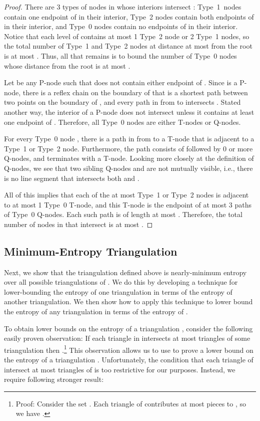 \documentclass[lotsofwhite]{patmorin}
\begin{document}
\begin{proof}
There are 3 types of nodes in  whose interiors intersect :
Type~1~nodes contain one endpoint of  in their interior, Type~2
nodes contain both endpoints of  in their interior, and Type~0
nodes contain no endpoints of  in their interior.  Notice that each
level of  contains at most 1 Type~2 node or 2 Type~1 nodes, so the
total number of Type~1 and Type~2 nodes at distance at most  from
the root is at most .  Thus, all
that remains is to bound the number of Type~0 nodes whose distance
from the root is at most .

Let  be any P-node such that  does not contain either
endpoint of .  Since  is a P-node, there is a reflex chain 
on the boundary of  that is a shortest path between two points on
the boundary of , and every path in  from  to 
intersects . Stated another way, the interior of a P-node does
not intersect  unless it contains at least one endpoint of .
Therefore, all Type~0 nodes are either T-nodes or Q-nodes.

For every Type~0 node , there is a path  in  from  to a
T-node that is adjacent to a Type~1 or Type~2 node.  Furthermore, the
path  consists of  followed by 0 or more Q-nodes, and
terminates with a T-node.  Looking more closely at the definition of
Q-nodes, we see that two sibling Q-nodes  and  are not mutually
visible, i.e., there is no line segment  that intersects
both  and .

All of this implies that each of the at most  Type~1 or Type~2 
nodes is adjacent to at most 1 Type~0 T-node, and this T-node is the
endpoint of at most 3 paths of Type~0 Q-nodes. Each such path is of
length at most .  Therefore, the total number of nodes in  that
intersect  is at most  .
\end{proof}

\subsection{Minimum-Entropy Triangulation}

Next, we show that the triangulation  defined above is
nearly-minimum entropy over all possible triangulations of .  We do
this by developing a technique for lower-bounding the entropy of one
triangulation in terms of the entropy of another triangulation.  We
then show how to apply this technique to lower bound the entropy of
any triangulation  in terms of the entropy of .
  
To obtain lower bounds on the entropy of a triangulation ,
consider the following easily proven observation: If each triangle in
 intersects at most  triangles of some triangulation
 then .\footnote{Proof:
Consider the set .
Each triangle of  contributes at most  pieces to , so
we have .}  This
observation allows us to use  to prove a lower bound on the
entropy of a triangulation .  Unfortunately, the condition
that each triangle of  intersect at most  triangles of
 is too restrictive for our purposes.  Instead, we require
following stronger result:
\end{document}
